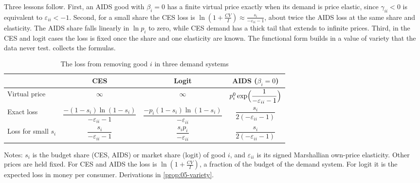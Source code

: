 Three lessons follow. First, an AIDS good with $\beta_i = 0$ has a finite virtual price exactly when its demand
is price elastic, since $\gamma_{ii} < 0$ is equivalent to $\varepsilon_{ii} < -1$. Second, for a small share
the CES loss is $\ln(1 + \frac{CV}{I}) \approx \frac{s_i}{-\varepsilon_{ii} - 1}$, about twice the AIDS loss
at the same share and elasticity. The AIDS share falls linearly in $\ln p_i$ to zero, while CES demand has a
thick tail that extends to infinite prices. Third, in the CES and logit cases the loss is fixed once the share
and one elasticity are known. The functional form builds in a value of variety that the data never test.
 collects the formulas.

\begin{table}[htbp]
\centering
\caption{The loss from removing good $i$ in three demand systems}\label{tab:05-variety}
\begin{threeparttable}
\renewcommand{\arraystretch}{1.8}
\begin{tabular}{@{}lccc@{}}
\toprule
 & CES & Logit & AIDS ($\beta_i = 0$) \\
\midrule
Virtual price & $\infty$ & $\infty$ & $p_i^0\exp\Bigl(\dfrac{1}{-\varepsilon_{ii}-1}\Bigr)$ \\
Exact loss & $\dfrac{-(1-s_i)\ln(1-s_i)}{-\varepsilon_{ii}-1}$
  & $\dfrac{-p_i(1-s_i)\ln(1-s_i)}{-\varepsilon_{ii}}$
  & $\dfrac{s_i}{2(-\varepsilon_{ii}-1)}$ \\
Loss for small $s_i$ & $\dfrac{s_i}{-\varepsilon_{ii}-1}$ & $\dfrac{s_ip_i}{-\varepsilon_{ii}}$ & $\dfrac{s_i}{2(-\varepsilon_{ii}-1)}$ \\
\bottomrule
\end{tabular}
\begin{tablenotes}[flushleft]\footnotesize
\item Notes: $s_i$ is the budget share (CES, AIDS) or market share (logit) of good $i$, and $\varepsilon_{ii}$ is
its signed Marshallian own-price elasticity. Other prices are held fixed. For CES and AIDS the loss is
$\ln(1 + \frac{CV}{I})$, a fraction of the budget of the demand system. For logit it is the expected loss in
money per consumer. Derivations in \cref{prop:05-variety}.
\end{tablenotes}
\end{threeparttable}
\end{table}

